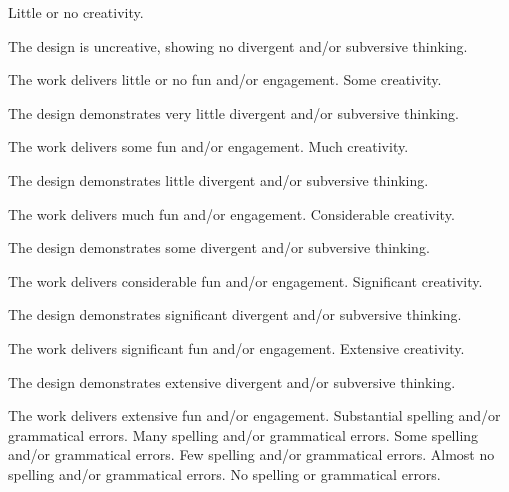 \documentclass{../../fal_assignment}
\begin{document}
\begin{markingrubric}
        \grade\fail Little or no creativity.
            \par The design is uncreative, showing no divergent and/or subversive thinking.
            \par The work delivers little or no fun and/or engagement.
        \grade Some creativity.
            \par The design demonstrates very little divergent and/or subversive thinking.
            \par The work delivers some fun and/or engagement.
        \grade Much creativity.
            \par The design demonstrates little divergent and/or subversive thinking.
            \par The work delivers much fun and/or engagement.
        \grade Considerable creativity.
            \par The design demonstrates some divergent and/or subversive thinking.
            \par The work delivers considerable fun and/or engagement.
        \grade Significant creativity.
            \par The design demonstrates significant divergent and/or subversive thinking.
            \par The work delivers significant fun and/or engagement.
        \grade Extensive creativity.
            \par The design demonstrates extensive divergent and/or subversive thinking.
            \par The work delivers extensive fun and/or engagement.
        \grade\fail 	Substantial spelling and/or grammatical errors.
        \grade 		Many spelling and/or grammatical errors.
        \grade 		Some spelling and/or grammatical errors.  
        \grade 		Few spelling and/or grammatical errors.
        \grade 		Almost no spelling and/or grammatical errors.
        \grade 		No spelling or grammatical errors.
\end{markingrubric}
\end{document}
